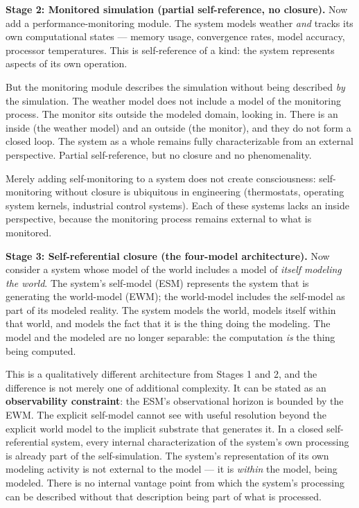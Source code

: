 \documentclass[12pt]{article}
\begin{document}
{\textbf{Stage 2: Monitored simulation (partial self-reference, no closure).} Now add a performance-monitoring module. The system models weather \emph{and} tracks its own computational states --- memory usage, convergence rates, model accuracy, processor temperatures. This is self-reference of a kind: the system represents aspects of its own operation.

But the monitoring module describes the simulation without being described \emph{by} the simulation. The weather model does not include a model of the monitoring process. The monitor sits outside the modeled domain, looking in. There is an inside (the weather model) and an outside (the monitor), and they do not form a closed loop. The system as a whole remains fully characterizable from an external perspective. Partial self-reference, but no closure and no phenomenality.

Merely adding self-monitoring to a system does not create consciousness: self-monitoring without closure is ubiquitous in engineering (thermostats, operating system kernels, industrial control systems). Each of these systems lacks an inside perspective, because the monitoring process remains external to what is monitored.

\textbf{Stage 3: Self-referential closure (the four-model architecture).} Now consider a system whose model of the world includes a model of \emph{itself modeling the world}. The system's self-model (ESM) represents the system that is generating the world-model (EWM); the world-model includes the self-model as part of its modeled reality. The system models the world, models itself within that world, and models the fact that it is the thing doing the modeling. The model and the modeled are no longer separable: the computation \emph{is} the thing being computed.

This is a qualitatively different architecture from Stages 1 and 2, and the difference is not merely one of additional complexity. It can be stated as an \textbf{observability constraint}: the ESM's observational horizon is bounded by the EWM. The explicit self-model cannot see with useful resolution beyond the explicit world model to the implicit substrate that generates it. In a closed self-referential system, every internal characterization of the system's own processing is already part of the self-simulation. The system's representation of its own modeling activity is not external to the model --- it is \emph{within} the model, being modeled. There is no internal vantage point from which the system's processing can be described without that description being part of what is processed.

}
\end{document}

